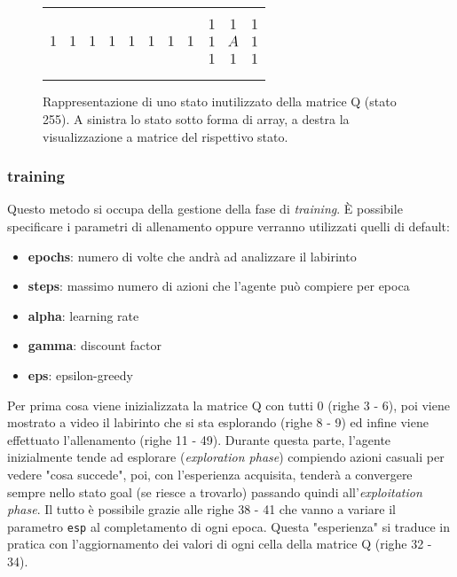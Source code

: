 \begin{figure}[H]
	\begin{tabular}{m{20em} m{20em}}
		\begin{equation*}
			\large
			\begin{matrix}
				1 & 1 & 1 & 1 & 1 & 1 & 1 & 1
			\end{matrix}
		\end{equation*}
		&
		\begin{equation*}
			\large
			\begin{matrix}
				1 & 1 & 1\\
				1 & A & 1\\
				1 & 1 & 1\\
			\end{matrix}
		\end{equation*}
	\end{tabular}
	\caption{Rappresentazione di uno stato inutilizzato della matrice Q (stato 255). A sinistra lo stato sotto forma di array, a destra la visualizzazione a matrice del rispettivo stato.}
\end{figure}

\subsubsection{training}

Questo metodo si occupa della gestione della fase di \textit{training}. \`{E} possibile specificare i parametri di allenamento oppure verranno utilizzati quelli di default:

\begin{itemize}
	\item \textbf{epochs}: numero di volte che andr\`{a} ad analizzare il labirinto
	\item \textbf{steps}: massimo numero di azioni che l'agente pu\`{o} compiere per epoca
	\item \textbf{alpha}: learning rate
	\item \textbf{gamma}: discount factor
	\item \textbf{eps}:  epsilon-greedy
\end{itemize}

Per prima cosa viene inizializzata la matrice Q con tutti 0 (righe 3 - 6), poi viene mostrato a video il labirinto che si sta esplorando (righe 8 - 9) ed infine viene effettuato l'allenamento (righe 11 - 49). Durante questa parte, l'agente inizialmente tende ad esplorare (\textit{exploration phase}) compiendo azioni casuali per vedere "cosa succede", poi, con l'esperienza acquisita, tender\`{a} a convergere sempre nello stato goal (se riesce a trovarlo) passando quindi all'\textit{exploitation phase}. Il tutto \`{e} possibile grazie alle righe 38 - 41 che vanno a variare il parametro \lstinline[style=cmd]|esp| al completamento di ogni epoca. Questa "esperienza" si traduce in pratica con l'aggiornamento dei valori di ogni cella della matrice Q (righe 32 - 34).\\

